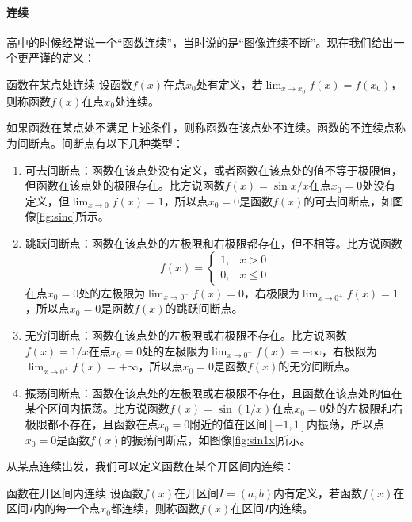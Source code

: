 \paragraph{连续}

高中的时候经常说一个“函数连续”，当时说的是“图像连续不断”。现在我们给出一个更严谨的定义：
\begin{definition}{函数在某点处连续}{}
    设函数$f(x)$在点$x_0$处有定义，若$\lim_{x \to x_0} f(x) = f(x_0)$，则称函数$f(x)$在点$x_0$处连续。
\end{definition}

如果函数在某点处不满足上述条件，则称函数在该点处不连续。函数的不连续点称为间断点。间断点有以下几种类型：
\begin{enumerate}
    \item 可去间断点：函数在该点处没有定义，或者函数在该点处的值不等于极限值，但函数在该点处的极限存在。比方说函数$f(x) = \sin x / x$在点$x_0 = 0$处没有定义，但$\lim_{x \to 0} f(x) = 1$，所以点$x_0 = 0$是函数$f(x)$的可去间断点，如图像\cref{fig:sinc}所示。
    \item 跳跃间断点：函数在该点处的左极限和右极限都存在，但不相等。比方说函数
        \begin{equation}
            f(x) =
            \begin{cases} 1, & x > 0 \\
                0, & x \le 0
            \end{cases}
        \end{equation}
        在点$x_0 = 0$处的左极限为$\lim_{x \to 0^-} f(x) = 0$，右极限为$\lim_{x \to 0^+} f(x) = 1$，所以点$x_0 = 0$是函数$f(x)$的跳跃间断点。
    \item 无穷间断点：函数在该点处的左极限或右极限不存在。比方说函数$f(x) = 1/x$在点$x_0 = 0$处的左极限为$\lim_{x \to 0^-} f(x) = -\infty$，右极限为$\lim_{x \to 0^+} f(x) = +\infty$，所以点$x_0 = 0$是函数$f(x)$的无穷间断点。
    \item 振荡间断点：函数在该点处的左极限或右极限不存在，且函数在该点处的值在某个区间内振荡。比方说函数$f(x) = \sin(1/x)$在点$x_0 = 0$处的左极限和右极限都不存在，且函数在点$x_0 = 0$附近的值在区间$[-1, 1]$内振荡，所以点$x_0 = 0$是函数$f(x)$的振荡间断点，如图像\cref{fig:sin1x}所示。
\end{enumerate}

从某点连续出发，我们可以定义函数在某个开区间内连续：
\begin{definition}{函数在开区间内连续}{}
    设函数$f(x)$在开区间$I = (a, b)$内有定义，若函数$f(x)$在区间$I$内的每一个点$x_0$都连续，则称函数$f(x)$在区间$I$内连续。
\end{definition}


